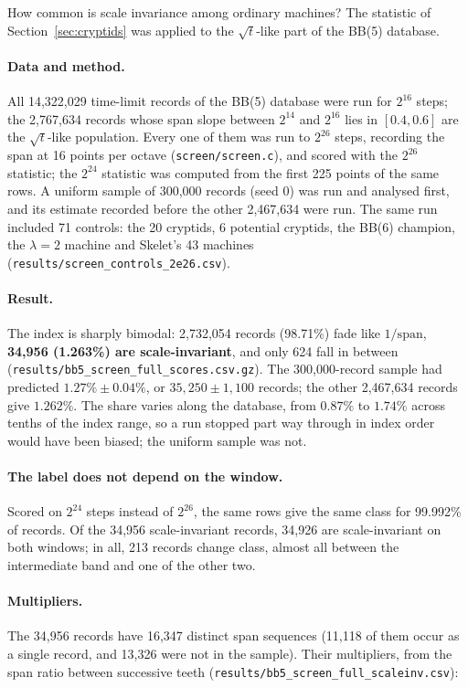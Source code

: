\documentclass[11pt,a4paper]{article}
\newcommand{\BB}[1]{BB(#1)}
\begin{document}
How common is scale invariance among ordinary machines? The statistic of Section~\ref{sec:cryptids}
was applied to the $\sqrt t$-like part of the \BB{5} database.

\paragraph{Data and method.} All 14,322,029 time-limit records of the \BB{5} database were run for
$2^{16}$ steps; the 2,767,634 records whose span slope between $2^{14}$ and $2^{16}$ lies in
$[0.4, 0.6]$ are the $\sqrt t$-like population. Every one of them was run to $2^{26}$ steps,
recording the span at 16 points per octave (\texttt{screen/screen.c}), and scored with the $2^{26}$
statistic; the $2^{24}$ statistic was computed from the first 225 points of the same rows. A
uniform sample of 300,000 records (seed 0) was run and analysed first, and its estimate recorded
before the other 2,467,634 were run. The same run included 71 controls: the 20 cryptids, 6
potential cryptids, the \BB{6} champion, the $\lambda = 2$ machine and Skelet's 43 machines
(\texttt{results/screen\_controls\_2e26.csv}).

\paragraph{Result.} The index is sharply bimodal: 2,732,054 records (98.71\%) fade like
$1/\mathrm{span}$, \textbf{34,956 (1.263\%) are scale-invariant}, and only 624 fall in between
(\texttt{results/bb5\_screen\_full\_scores.csv.gz}). The 300,000-record sample had predicted
$1.27\% \pm 0.04\%$, or $35{,}250 \pm 1{,}100$ records; the other 2,467,634 records give $1.262\%$.
The share varies along the database, from $0.87\%$ to $1.74\%$ across tenths of the index range,
so a run stopped part way through in index order would have been biased; the uniform sample was
not.

\paragraph{The label does not depend on the window.} Scored on $2^{24}$ steps instead of $2^{26}$,
the same rows give the same class for 99.992\% of records. Of the 34,956 scale-invariant records,
34,926 are scale-invariant on both windows; in all, 213 records change class, almost all between
the intermediate band and one of the other two.

\paragraph{Multipliers.} The 34,956 records have 16,347 distinct span sequences (11,118 of them
occur as a single record, and 13,326 were not in the sample). Their multipliers, from the span
ratio between successive teeth (\texttt{results/bb5\_screen\_full\_scaleinv.csv}):
\end{document}
